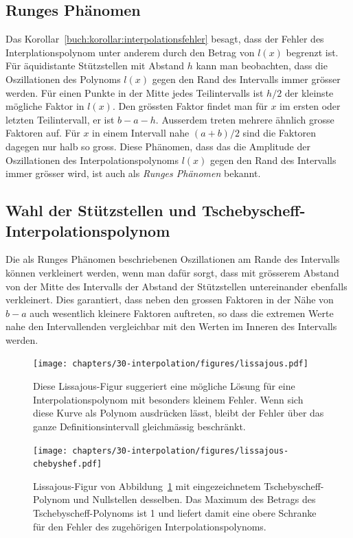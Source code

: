 \subsection{Runges Phänomen
\label{buch:section:interpolation:runge}}
%
%
Das Korollar~\ref{buch:korollar:interpolationsfehler} besagt, dass der
Fehler des Interplationspolynom unter anderem durch den Betrag von $l(x)$
begrenzt ist.
Für äquidistante Stützstellen mit Abstand $h$ kann man beobachten,
dass die Oszillationen des Polynoms $l(x)$ gegen den Rand des Intervalls
immer grösser werden.
%
Für einen Punkte in der Mitte jedes Teilintervalls ist $h/2$ der kleinste
mögliche Faktor in $l(x)$. 
Den grössten Faktor findet man für $x$ im ersten oder letzten Teilintervall,
er ist $b-a-h$.
Ausserdem treten mehrere ähnlich grosse Faktoren auf.
Für $x$ in einem Intervall nahe $(a+b)/2$ sind die Faktoren
dagegen nur halb so gross.
Diese Phänomen, dass das die Amplitude der Oszillationen des
Interpolationspolynoms $l(x)$ gegen den Rand des Intervalls immer
grösser wird, ist auch als {\em Runges Phänomen} bekannt.

%
%
\subsection{Wahl der Stützstellen und Tschebyscheff-Interpolationspolynom
\label{buch:section:interpolation:tschebyscheff}}
Die als Runges Phänomen beschriebenen Oszillationen am Rande des Intervalls
können verkleinert werden, wenn man dafür sorgt, dass
mit grösserem Abstand von der Mitte des Intervalls der Abstand der
Stützstellen untereinander ebenfalls verkleinert.
%
%
Dies garantiert, dass neben den grossen Faktoren in der Nähe von $b-a$ 
auch wesentlich kleinere Faktoren auftreten, so dass die extremen Werte
nahe den Intervallenden vergleichbar mit den Werten im Inneren des
Intervalls werden.

\begin{figure}
\centering
\texttt{[image: chapters/30-interpolation/figures/lissajous.pdf]}
\caption{Diese Lissajous-Figur suggeriert eine mögliche Lösung für eine 
Interpolationspolynom mit besonders kleinem Fehler.
%
Wenn sich diese Kurve als Polynom ausdrücken lässt, bleibt der Fehler über
das ganze Definitionsintervall gleichmässig beschränkt.
\label{buch:figure:lissajous}}
\end{figure}

\begin{figure}
\centering
\texttt{[image: chapters/30-interpolation/figures/lissajous-chebyshef.pdf]}
\caption{Lissajous-Figur von Abbildung~\ref{buch:figure:lissajous}
mit eingezeichnetem Tschebyscheff-Polynom und Nullstellen
desselben.
%
%
Das Maximum des Betrags des Tschebyscheff-Polynoms ist 1 und liefert 
damit eine obere Schranke für den Fehler des zugehörigen
Interpolationspolynoms.
%
\label{buch:figure:lissajous-chebyshef}}
\end{figure}

